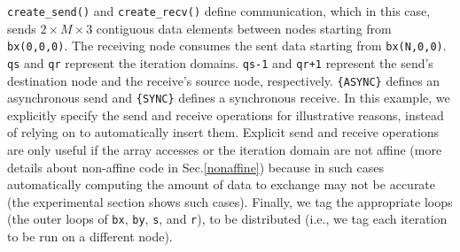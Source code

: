 \texttt{create\_send()} and \texttt{create\_recv()} define communication, which in this case, sends $2\times M \times3$ contiguous data elements between nodes starting from \texttt{bx(0,0,0)}. The receiving node consumes the sent data starting from \texttt{bx(N,0,0)}. \texttt{qs} and \texttt{qr} represent the iteration domains. \texttt{qs-1} and \texttt{qr+1} represent the send's destination node and the receive's source node, respectively. \texttt{\{ASYNC\}} defines an asynchronous send and \texttt{\{SYNC\}} defines a synchronous receive.
In this example, we explicitly specify the send and receive operations for illustrative reasons, instead of relying on \framework to automatically insert them.
Explicit send and receive operations are only useful if the array accesses or the iteration domain are not affine (more details about non-affine code in Sec.\ref{nonaffine}) because in such cases automatically computing the amount of data to exchange may not be accurate (the experimental section shows such cases).
Finally, we tag the appropriate loops (the outer loops of \texttt{bx}, \texttt{by}, \texttt{s}, and \texttt{r}), to be distributed (i.e., we tag each iteration to be run on a different node).



